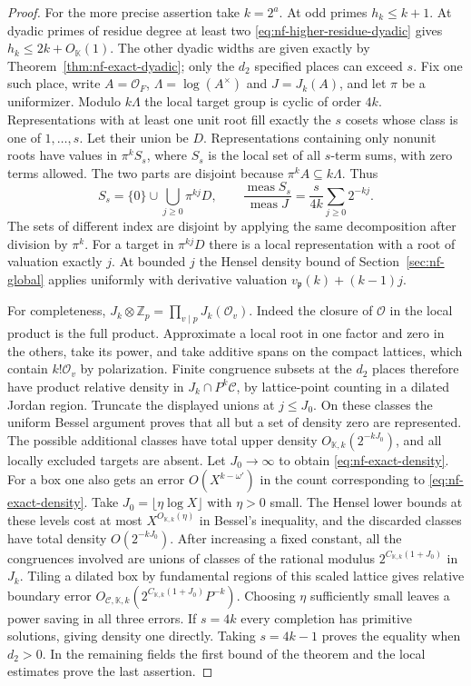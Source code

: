\documentclass[11pt,letterpaper]{article}
\theoremstyle{definition}
\numberwithin{equation}{section}
\begin{document}
\begin{proof}
For the more precise assertion take $k=2^a$. At odd primes
$h_k\le k+1$. At dyadic primes of residue degree at least two
\eqref{eq:nf-higher-residue-dyadic} gives $h_k\le2k+O_{\mathbb K}(1)$.
The other dyadic widths are given exactly by
Theorem~\ref{thm:nf-exact-dyadic}; only the $d_2$ specified places
can exceed $s$. Fix one such place, write $A=\mathcal O_F$,
$\Lambda=\log(A^\times)$ and $J=J_k(A)$, and let $\pi$ be a uniformizer.
Modulo $k\Lambda$ the local target group is cyclic of order $4k$.
Representations with at least one unit root fill exactly the $s$
cosets whose class is one of $1,\ldots,s$. Let their union be $D$.
Representations containing only nonunit roots have values in
$\pi^k S_s$, where $S_s$ is the local set of all $s$-term sums,
with zero terms allowed. The two parts are disjoint because
$\pi^k A\subseteq k\Lambda$. Thus
\[
 S_s=\{0\}\cup\bigcup_{j\ge0}\pi^{kj}D,
 \qquad
 \frac{\operatorname{meas}S_s}{\operatorname{meas}J}
   =\frac{s}{4k}\sum_{j\ge0}2^{-kj}.
\]
The sets of different index are disjoint by applying the same
decomposition after division by $\pi^k$. For a target in
$\pi^{kj}D$ there is a local representation with a root of valuation
exactly $j$. At bounded $j$ the Hensel density bound of
Section~\ref{sec:nf-global} applies uniformly with derivative valuation
$v_{\mathfrak p}(k)+(k-1)j$.

For completeness, $J_k\otimes\mathbb Z_p=\prod_{v\mid p}J_k(\mathcal O_v)$.
Indeed the closure of $\mathcal O$ in the local product is the full
product. Approximate a local root in one factor and zero in the
others, take its power, and take additive spans on the compact
lattices, which contain $k!\mathcal O_v$ by polarization.
Finite congruence subsets at the $d_2$ places therefore have product
relative density in $J_k\cap P^k\mathcal C$, by lattice-point counting
in a dilated Jordan region. Truncate the displayed unions at
$j\le J_0$. On these classes the uniform Bessel argument proves
that all but a set of density zero are represented. The possible
additional classes have total upper density
$O_{\mathbb K,k}(2^{-kJ_0})$, and all locally excluded targets are
absent. Let $J_0\to\infty$ to obtain \eqref{eq:nf-exact-density}.
For a box one also gets an error $O(X^{k-\omega'})$ in the
count corresponding to \eqref{eq:nf-exact-density}. Take
$J_0=\lfloor\eta\log X\rfloor$ with $\eta>0$ small. The Hensel
lower bounds at these levels cost at most $X^{O_{\mathbb K,k}(\eta)}$
in Bessel's inequality, and the discarded classes have total
density $O(2^{-kJ_0})$. After increasing a fixed constant, all the
congruences involved are unions of classes of the rational modulus
$2^{C_{\mathbb K,k}(1+J_0)}$ in $J_k$. Tiling a dilated box by
fundamental regions of this scaled lattice gives relative boundary
error $O_{\mathcal C,\mathbb K,k}
(2^{C_{\mathbb K,k}(1+J_0)}P^{-k})$. Choosing $\eta$ sufficiently
small leaves a power saving in all three errors.
If $s=4k$ every completion has primitive solutions, giving
density one directly. Taking $s=4k-1$ proves the equality when
$d_2>0$. In the remaining fields the first bound of the theorem
and the local estimates prove the last assertion.
\end{proof}
\end{document}
